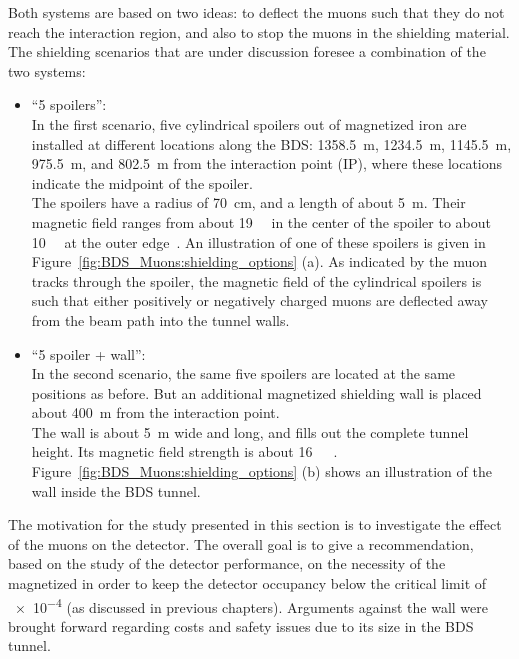 Both systems are based on two ideas: to deflect the muons such that they do not reach the interaction region, and also to stop the muons in the shielding material.
The shielding scenarios that are under discussion foresee a combination of the two systems:
\begin{itemize}
 \item ``5 spoilers'':\\
 In the first scenario, five cylindrical spoilers out of magnetized iron are installed at different locations along the BDS: \SI{1358.5}{\metre}, \SI{1234.5}{\metre}, \SI{1145.5}{\metre}, \SI{975.5}{\metre}, and \SI{802.5}{\metre} from the interaction point (IP), where these locations indicate the midpoint of the spoiler.
 \\The spoilers have a radius of \SI{70}{\centi\meter}, and a length of about \SI{5}{\meter}.
 Their magnetic field ranges from about \SI{19}{\kilo\gauss} in the center of the spoiler to about \SI{10}{\kilo\gauss} at the outer edge~\cite{MuonShielding,Lewis}.
 An illustration of one of these spoilers is given in Figure~\ref{fig:BDS_Muons:shielding_options} (a).
 As indicated by the muon tracks through the spoiler, the magnetic field of the cylindrical spoilers is such that either positively or negatively charged muons are deflected away from the beam path into the tunnel walls.
 \item ``5 spoiler + wall'':\\
 In the second scenario, the same five spoilers are located at the same positions as before.
 But an additional magnetized shielding wall is placed about \SI{400}{\meter} from the interaction point.
 \\The wall is about \SI{5}{\meter} wide and long, and fills out the complete tunnel height.
 Its magnetic field strength is about \SI{16}{\kilo\gauss}~\cite{MuonShielding,Lewis}.
 Figure~\ref{fig:BDS_Muons:shielding_options} (b) shows an illustration of the wall inside the BDS tunnel.
\end{itemize}
The motivation for the study presented in this section is to investigate the effect of the muons on the \sid detector.
The overall goal is to give a recommendation, based on the study of the detector performance, on the necessity of the magnetized in order to keep the detector occupancy below the critical limit of \num{e-4} (as discussed in previous chapters).
Arguments against the wall were brought forward regarding costs and safety issues due to its size in the BDS tunnel.
